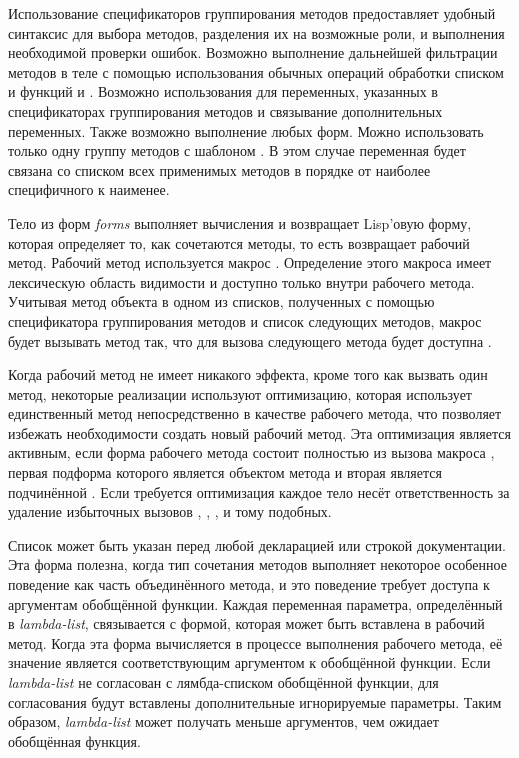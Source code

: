 \begin{defmac}
Использование спецификаторов группирования методов предоставляет удобный
синтаксис для выбора методов, разделения их на возможные роли, и выполнения
необходимой проверки ошибок. Возможно выполнение дальнейшей фильтрации методов в
теле с помощью использования обычных операций обработки списком и функций
 и . Возможно использования
 для переменных, указанных в спецификаторах группирования методов и
связывание дополнительных переменных. Также возможно выполнение любых
форм. Можно использовать только одну группу методов с шаблоном \cdf{*}. В этом
случае переменная будет связана со списком всех применимых методов в порядке от
наиболее специфичного к наименее.

Тело из форм \emph{forms} выполняет вычисления и возвращает Lisp'овую форму,
которая определяет то, как сочетаются методы, то есть возвращает рабочий
метод. Рабочий метод используется макрос . Определение этого
макроса имеет лексическую область видимости и доступно только внутри рабочего
метода.
Учитывая метод объекта в одном из списков, полученных с помощью спецификатора
группирования методов и список следующих методов, макрос  будет
вызывать метод так, что для вызова следующего метода будет доступна
.

Когда рабочий метод не имеет никакого эффекта, кроме того как вызвать один
метод, некоторые реализации используют оптимизацию, которая использует 
единственный метод непосредственно в качестве рабочего метода, что позволяет
избежать необходимости создать новый рабочий метод. Эта оптимизация является
активным, если форма рабочего метода состоит полностью из вызова
макроса , первая подформа которого является объектом метода
и вторая является подчинённой . Если требуется оптимизация каждое тело
несёт ответственность за удаление 
избыточных вызовов , , , 
и тому подобных.

Список  может быть указан перед любой
декларацией или строкой документации. Эта форма полезна, когда
тип сочетания методов выполняет некоторое особенное поведение как часть
объединённого метода, и это поведение требует доступа к аргументам обобщённой функции.
Каждая переменная параметра, определённый в \emph{lambda-list},
связывается с формой, которая может быть вставлена в рабочий метод. Когда эта
форма вычисляется в процессе выполнения рабочего метода, её значение является
соответствующим аргументом к обобщённой функции. Если \emph{lambda-list} не
согласован с лямбда-списком обобщённой функции, для согласования будут вставлены
дополнительные игнорируемые параметры. Таким образом, \emph{lambda-list} может
получать меньше аргументов, чем ожидает обобщённая функция.


\end{defmac}
